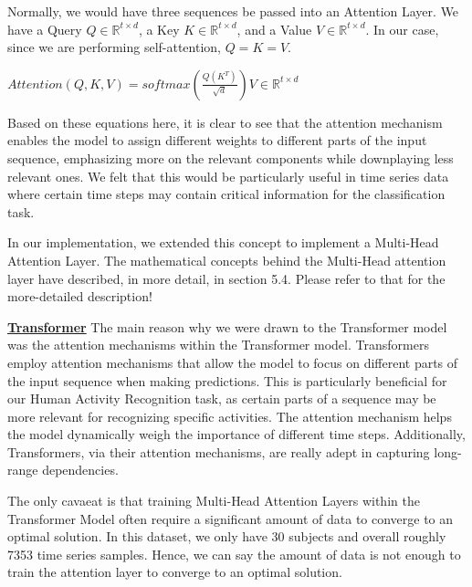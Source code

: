 \documentclass[conference]{IEEEtran}
\begin{document}
Normally, we would have three sequences be passed into an Attention Layer. We have a Query $Q \in \mathbb{R}^{t \times d}$, a Key $K \in \mathbb{R}^{t \times d}$, and a Value $V \in \mathbb{R}^{t \times d}$. In our case, since we are performing self-attention, $Q = K = V$. \newline 

$Attention(Q, K, V) = softmax(\frac{Q (K^T)}{\sqrt{d}}) V \in \mathbb{R}^{t \times d}$ \newline 

Based on these equations here, it is clear to see that the attention mechanism enables the model to assign different weights to different parts of the input sequence, emphasizing more on the relevant components while downplaying less relevant ones. We felt that this would be particularly useful in time series data where certain time steps may contain critical information for the classification task. \newline 


In our implementation, we extended this concept to implement a Multi-Head Attention Layer. The mathematical concepts behind the Multi-Head attention layer have described, in more detail, in section 5.4. Please refer to that for the more-detailed description! \newline 

\textbf{\underline{Transformer}} \newline 
The main reason why we were drawn to the Transformer model was the attention mechanisms within the Transformer model. Transformers employ attention mechanisms that allow the model to focus on different parts of the input sequence when making predictions. This is particularly beneficial for our Human Activity Recognition task, as certain parts of a sequence may be more relevant for recognizing specific activities. The attention mechanism helps the model dynamically weigh the importance of different time steps. Additionally, Transformers, via their attention mechanisms, are really adept in capturing long-range dependencies. \newline 

The only cavaeat is that training Multi-Head Attention Layers within the Transformer Model often require a significant amount of data to converge to an optimal solution. In this dataset, we only have 30 subjects and overall roughly 7353 time series samples. Hence, we can say the amount of data is not enough to train the attention layer to converge to an optimal solution. 
\end{document}
